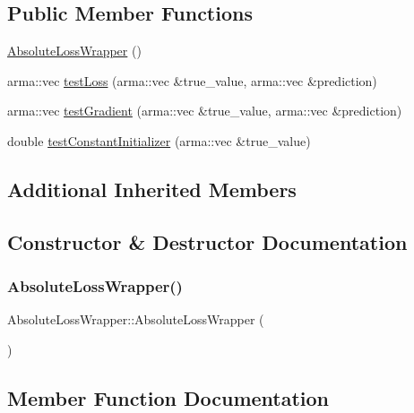 \subsection*{Public Member Functions}
\begin{DoxyCompactItemize}
\item 
\mbox{\hyperlink{class_absolute_loss_wrapper_a151f4cb809a23833954da7c7b407eead}{Absolute\+Loss\+Wrapper}} ()
\item 
arma\+::vec \mbox{\hyperlink{class_absolute_loss_wrapper_a85a76340b719fa2af7cc9964c7e668ed}{test\+Loss}} (arma\+::vec \&true\+\_\+value, arma\+::vec \&prediction)
\item 
arma\+::vec \mbox{\hyperlink{class_absolute_loss_wrapper_af64fe7b1882afacfc7cc408a79884861}{test\+Gradient}} (arma\+::vec \&true\+\_\+value, arma\+::vec \&prediction)
\item 
double \mbox{\hyperlink{class_absolute_loss_wrapper_ad90572ebb3a5bf84793f4bf1b42e56b9}{test\+Constant\+Initializer}} (arma\+::vec \&true\+\_\+value)
\end{DoxyCompactItemize}
\subsection*{Additional Inherited Members}


\subsection{Constructor \& Destructor Documentation}
\mbox{\label{class_absolute_loss_wrapper_a151f4cb809a23833954da7c7b407eead}} 
\subsubsection{\texorpdfstring{Absolute\+Loss\+Wrapper()}{AbsoluteLossWrapper()}}
{\footnotesize\ttfamily Absolute\+Loss\+Wrapper\+::\+Absolute\+Loss\+Wrapper (\begin{DoxyParamCaption}{ }\end{DoxyParamCaption})\hspace{0.3cm}{\ttfamily [inline]}}



\subsection{Member Function Documentation}
\mbox{\label{class_absolute_loss_wrapper_ad90572ebb3a5bf84793f4bf1b42e56b9}} 
